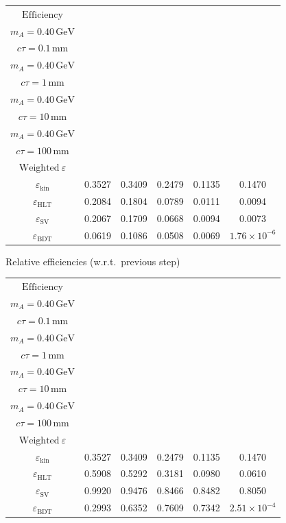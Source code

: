\documentclass[10pt,a4paper]{article}
\begin{document}
{\begin{tabular}{cccccc}
\toprule
$\mathrm{Efficiency}$ & \shortstack{$m_{\pi}=4\,\mathrm{GeV}$\\$m_{A}=0.40\,\mathrm{GeV}$\\$c\tau=0.1\,\mathrm{mm}$} & \shortstack{$m_{\pi}=4\,\mathrm{GeV}$\\$m_{A}=0.40\,\mathrm{GeV}$\\$c\tau=1\,\mathrm{mm}$} & \shortstack{$m_{\pi}=4\,\mathrm{GeV}$\\$m_{A}=0.40\,\mathrm{GeV}$\\$c\tau=10\,\mathrm{mm}$} & \shortstack{$m_{\pi}=4\,\mathrm{GeV}$\\$m_{A}=0.40\,\mathrm{GeV}$\\$c\tau=100\,\mathrm{mm}$} & \shortstack{$\mathrm{QCD}$\\$\mathrm{Weighted}\ \varepsilon$} \\
\midrule
$\varepsilon_{\mathrm{kin}}$ & 0.3527 & 0.3409 & 0.2479 & 0.1135 & 0.1470\\
$\varepsilon_{\mathrm{HLT}}$ & 0.2084 & 0.1804 & 0.0789 & 0.0111 & 0.0094\\
$\varepsilon_{\mathrm{SV}}$ & 0.2067 & 0.1709 & 0.0668 & 0.0094 & 0.0073\\
$\varepsilon_{\mathrm{BDT}}$ & 0.0619 & 0.1086 & 0.0508 & 0.0069 & $1.76\times10^{-6}$\\
\bottomrule
\end{tabular}

\vspace{18pt}

Relative efficiencies (w.r.t.\ previous step)

\begin{tabular}{cccccc}
\toprule
$\mathrm{Efficiency}$ & \shortstack{$m_{\pi}=4\,\mathrm{GeV}$\\$m_{A}=0.40\,\mathrm{GeV}$\\$c\tau=0.1\,\mathrm{mm}$} & \shortstack{$m_{\pi}=4\,\mathrm{GeV}$\\$m_{A}=0.40\,\mathrm{GeV}$\\$c\tau=1\,\mathrm{mm}$} & \shortstack{$m_{\pi}=4\,\mathrm{GeV}$\\$m_{A}=0.40\,\mathrm{GeV}$\\$c\tau=10\,\mathrm{mm}$} & \shortstack{$m_{\pi}=4\,\mathrm{GeV}$\\$m_{A}=0.40\,\mathrm{GeV}$\\$c\tau=100\,\mathrm{mm}$} & \shortstack{$\mathrm{QCD}$\\$\mathrm{Weighted}\ \varepsilon$} \\
\midrule
$\varepsilon_{\mathrm{kin}}$ & 0.3527 & 0.3409 & 0.2479 & 0.1135 & 0.1470\\
$\varepsilon_{\mathrm{HLT}}$ & 0.5908 & 0.5292 & 0.3181 & 0.0980 & 0.0610\\
$\varepsilon_{\mathrm{SV}}$ & 0.9920 & 0.9476 & 0.8466 & 0.8482 & 0.8050\\
$\varepsilon_{\mathrm{BDT}}$ & 0.2993 & 0.6352 & 0.7609 & 0.7342 & $2.51\times10^{-4}$\\
\bottomrule
\end{tabular}

}
\end{document}

